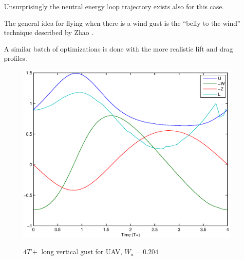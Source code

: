Unsurprisingly the neutral energy loop trajectory exists also for this case.

\par The general idea for flying when there is a wind gust is the ``belly to the wind'' technique described by Zhao \cite{zhao2004optimal}.

\FloatBarrier

\par A similar batch of optimizations is done with the more realistic lift and drag profiles.


\begin{figure}[h]
	\begin{center}
		\scalebox{0.8}
		{\includegraphics{./Figures/Windtype=1_Tg=4_Wg=0p204_UAV_alphamax=12.eps}}
	\end{center}
	\caption{$4T+$ long vertical gust for UAV, $W_a=0.204$}
	\label{fig:vertical_optimization_UAV}
\end{figure}


